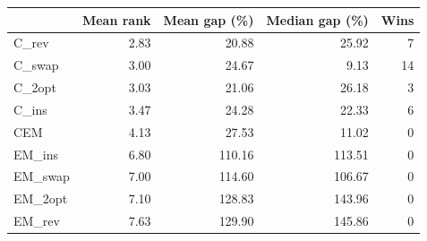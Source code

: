 \begin{tabular}{lrrrr}
\toprule
 & Mean rank & Mean gap (\%) & Median gap (\%) & Wins \\
\midrule
C\_rev & 2.83 & 20.88 & 25.92 & 7 \\
C\_swap & 3.00 & 24.67 & 9.13 & 14 \\
C\_2opt & 3.03 & 21.06 & 26.18 & 3 \\
C\_ins & 3.47 & 24.28 & 22.33 & 6 \\
CEM & 4.13 & 27.53 & 11.02 & 0 \\
EM\_ins & 6.80 & 110.16 & 113.51 & 0 \\
EM\_swap & 7.00 & 114.60 & 106.67 & 0 \\
EM\_2opt & 7.10 & 128.83 & 143.96 & 0 \\
EM\_rev & 7.63 & 129.90 & 145.86 & 0 \\
\bottomrule
\end{tabular}
